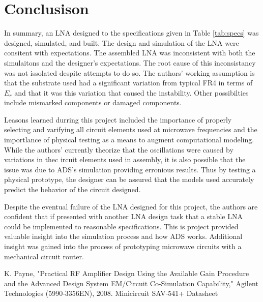 \documentclass[conference]{IEEEtran}
\begin{document}
\section{Conclusison}
In summary, an LNA designed to the specifications given in Table \ref{tab:specs} was designed, simulated, and built. The design and simulation of the LNA were consitent with expectations. The assembled LNA was inconsistent with both the simulaitons and the designer's expectations. The root cause of this inconsistancy was not issolated despite attempts to do so. The authors' working assumption is that the substrate used had a significant variation from typical FR4 in terms of $E_r$ and that it was this variation that caused the instability. Other possibilties include mismarked components or damaged components. 

Leasons learned durring this project included the importance of properly selecting and varifying all circuit elements used at microwave frequencies and the importlance of physical testing as a means to augment computational modeling. While the authors' currently theorize that the oscillations were caused by variations in thec ircuit elements used in assembly, it is also possible that the issue was due to ADS's simulation providing erronious results. Thus by testing a physical prototype, the designer can be assured that the models used accurately predict the behavior of the circuit designed.

Despite the eventual failure of the LNA designed for this project, the authors are confident that if presented with another LNA design task that a stable LNA could be implemented to reasonable specifications. This is project provided valuable insight into the simulation process and how ADS works. Additional insight was gained into the process of prototyping microwave circuits with a mechanical circuit router.
\begin{thebibliography}{1}
K. Payne, "Practical RF Amplifier Design Using the Available Gain Procedure and the Advanced Design System EM/Circuit Co-Simulation Capability," Agilent Technologies (5990-3356EN), 2008.
Minicircuit SAV-541+ Datasheet
\end{thebibliography}
\end{document}
